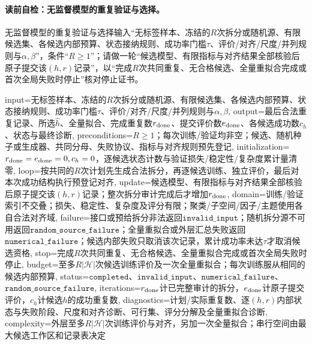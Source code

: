 \paragraph{读前自检：无监督模型的重复验证与选择。}无监督模型的重复验证与选择输入“无标签样本、冻结的$R$次拆分或随机源、有限候选集、各候选内部预算、状态接纳规则、成功率门槛$\tau$、评价/对齐/尺度/并列规则与$\alpha,\beta$”，条件“$R\ge1$”；请做一轮“候选模型、有限指标与对齐结果全部核验后原子提交该$(h,r)$记录”，以“完成$R$次共同重复、无合格候选、全量重拟合完成或首次全局失败时停止”核对停止证书。\par

\begin{AlgorithmContract}{
  input={无标签样本、冻结的$R$次拆分或随机源、有限候选集、各候选内部预算、状态接纳规则、成功率门槛$\tau$、评价/对齐/尺度/并列规则与$\alpha,\beta$},
  output={最后合法重复记录、所选$\widehat h$、全量拟合、完成重复数$r_{\rm done}$、提交评价数$e_{\rm done}$、各候选成功数$c_h$、状态与最终诊断},
  preconditions={$R\ge1$；每次训练/验证均非空；候选、随机种子或生成器、共同分母、失败协议、指标与对齐规则预先登记},
  initialization={$r_{\rm done}=e_{\rm done}=0,c_h=0$，逐候选状态计数与验证损失/稳定性/复杂度累计量清零},
  loop={按共同的$R$次计划先生成合法拆分，再逐候选训练、独立评价，最后对本次成功结构执行预登记对齐},
  update={候选模型、有限指标与对齐结果全部核验后原子提交该$(h,r)$记录；整次拆分审计完成后才增加$r_{\rm done}$},
  domain={训练/验证索引不交叠；损失、稳定性、复杂度及评分有限；聚类/子空间/因子/主题使用各自合法对齐域},
  failure={接口或预给拆分非法返回$\mathtt{invalid\_input}$；随机拆分源不可用返回$\mathtt{random\_source\_failure}$；全量重拟合或外层汇总失败返回$\mathtt{numerical\_failure}$；候选内部失败只取消该次记录，累计成功率未达$\tau$才取消候选资格},
  stop={完成$R$次共同重复、无合格候选、全量重拟合完成或首次全局失败时停止},
  budget={至多$R|\mathcal H|$次候选训练评价及一次全量重拟合；每次训练服从相同的候选内部预算},
  status={$\mathtt{completed}$、$\mathtt{invalid\_input}$、$\mathtt{numerical\_failure}$、$\mathtt{random\_source\_failure}$},
  iterations={$r_{\rm done}$计已完整审计的拆分，$e_{\rm done}$计原子提交评价，$c_h$计候选$h$的成功重复数},
  diagnostics={计划/实际重复数、逐$(h,r)$内部状态与失败阶段、尺度和对齐诊断、可行集、评分分解及全量重拟合诊断},
  complexity={外层至多$R|\mathcal H|$次训练评价与对齐，另加一次全量拟合；串行空间由最大候选工作区和记录表决定}
}
\begin{algorithm}[H]
\caption{无监督模型的重复验证与选择}\label{alg:V4-C01-selection}

\end{algorithm}
\end{AlgorithmContract}
